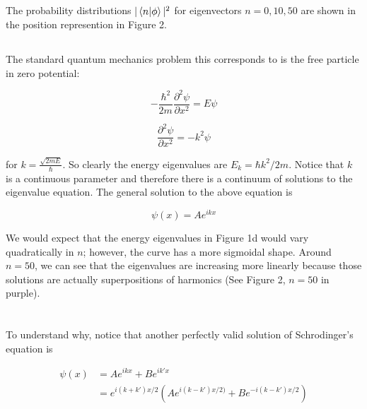 \documentclass[%
 reprint,
 amsmath,amssymb,
 aps,
]{revtex4-2}
\begin{document}
\subsection{}

The probability distributions $|\bra{n}\ket{\phi}|^{2}$ for eigenvectors $n = 0, 10, 50$ are shown in the position represention in Figure 2.

\subsection{}

The standard quantum mechanics problem this corresponds to is the free particle in zero potential:

\begin{equation*}
-\frac{\hbar^{2}}{2m}\frac{\partial^{2}\psi}{\partial x^{2}} = E\psi
\end{equation*}

\begin{equation*}
\frac{\partial^{2}\psi}{\partial x^{2}} = -k^{2}\psi
\end{equation*}

for $k = \frac{\sqrt{2mE}}{\hbar}$. So clearly the energy eigenvalues are $E_{k} = \hbar k^{2}/2m$. Notice that $k$ is a continuous parameter and therefore there is a continuum of solutions to the eigenvalue equation. The general solution to the above equation is

\begin{equation*}
\psi(x) = Ae^{ikx}
\end{equation*}

We would expect that the energy eigenvalues in Figure 1d would vary quadratically in $n$; however, the curve has a more sigmoidal shape. Around $n=50$, we can see that the eigenvalues are increasing more linearly because those solutions are actually superpositions of harmonics (See Figure 2, $n=50$ in purple). 

\section{}

To understand why, notice that another perfectly valid solution of Schrodinger's equation is


\begin{align*}
\psi(x) &= Ae^{ikx} + Be^{ik'x} \\
&= e^{i(k+k')x/2}\left(Ae^{i(k-k')x/2)} + Be^{-i(k-k')x/2}\right)
\end{align*}
\end{document}
